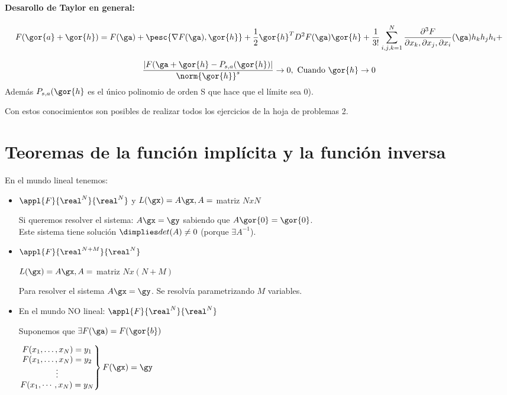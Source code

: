 \documentclass{apuntes}
\begin{document}
\paragraph{Desarollo de Taylor en general:}

$$F(\gor{a}+\gor{h}) = F(\ga) + \pesc{\nabla F(\ga),\gor{h}} + \frac{1}{2} \gor{h}^T D^2F(\ga)\gor{h} + \frac{1}{3!}\sum_{i,j,k=1}^N \frac{\partial^3F}{\partial x_k,\partial x_j, \partial x_i} (\ga) h_kh_jh_i + $$

\begin{theorem}
 $$\frac{|F(\ga+\gor{h} - P_{s,a}(\gor{h})|}{\norm{\gor{h}}^s} \rightarrow 0, \text{ Cuando } \gor{h} \rightarrow 0$$
 Además $P_{s,a}(\gor{h}$ es el único polinomio de orden S que hace que el límite sea 0).
\end{theorem}

Con estos conocimientos son posibles de realizar todos los ejercicios de la hoja de problemas 2.

\section{Teoremas de la función implícita y la función inversa}

En el mundo lineal tenemos: 

\begin{itemize} \item $\appl{F}{\real^N}{\real^N}$ y 
$L(\gx) = A\gx,  A = $ matriz $NxN$


Si queremos resolver el sistema: $A\gx = \gy$ sabiendo que $A\gor{0} = \gor{0}$.\\ Este sistema tiene solución $\dimplies det(A) \neq 0$ (porque $\exists A^{-1}$).
\item
$\appl{F}{\real^{N+M}}{\real^N}$

$L(\gx) = A\gx, A = $ matriz $Nx(N+M)$

Para resolver el sistema $A\gx = \gy$.  Se resolvía parametrizando $M$ variables.

\item En el mundo NO lineal:
$\appl{F}{\real^N}{\real^N}$

Suponemos que $\exists F(\ga) = F(\gor{b})$

$\left.\begin{matrix}
F(x_1,\dotsc,x_N) = y_1\\
F(x_1,\dotsc,x_N) = y_2\\
\vdots\\
F(x_1,\cdots,x_N) = y_N          
        \end{matrix}
\right\} F(\gx)=\gy$
\end{itemize}
\end{document}
